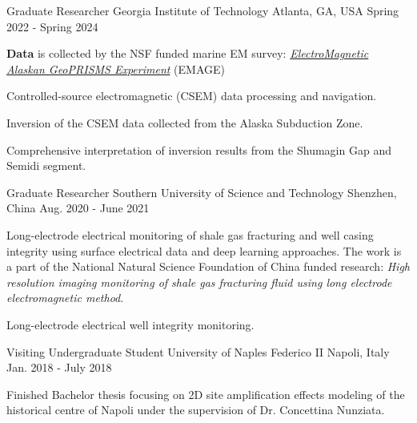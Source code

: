 

\begin{cventries}

  \cventry
    {Graduate Researcher} %
    {Georgia Institute of Technology} %
    {Atlanta, GA, USA} %
    {Spring 2022 - Spring 2024} %
    {
      \begin{cvitems}
        \item {\textbf{Data} is collected by the NSF funded marine EM survey: \href{https://egl.eas.gatech.edu/projects/emage/}{\textit{ElectroMagnetic Alaskan GeoPRISMS Experiment}} (EMAGE)}
        \item {Controlled-source electromagnetic (CSEM) data processing and navigation.}
        \item {Inversion of the CSEM data collected from the Alaska Subduction Zone.}
        \item {Comprehensive interpretation of inversion results from the Shumagin Gap and Semidi segment.}
      \end{cvitems}
    }

  \cventry
    {Graduate Researcher} %
    {Southern University of Science and Technology} %
    {Shenzhen, China} %
    {Aug. 2020 - June 2021} %
    {
      \begin{cvitems} %
        \item {Long-electrode electrical monitoring of shale gas fracturing and well casing integrity using surface electrical data and deep learning approaches. The work is a part of the National Natural Science Foundation of China funded research: \textit{High resolution imaging monitoring of shale gas fracturing fluid using long electrode electromagnetic method}.}
        \item {Long-electrode electrical well integrity monitoring.}
      \end{cvitems}
    }

  \cventry
    {Visiting Undergraduate Student} %
    {University of Naples Federico II} %
    {Napoli, Italy} %
    {Jan. 2018 - July 2018} %
    {
      \begin{cvitems} %
        \item {Finished Bachelor thesis focusing on 2D site amplification effects modeling of the historical centre of Napoli under the supervision of Dr. Concettina Nunziata.}
      \end{cvitems}
    }

\end{cventries}
